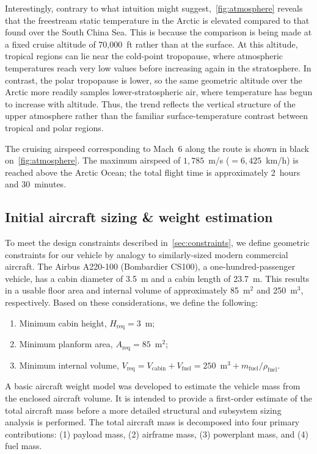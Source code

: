 \documentclass[10pt,a4paper]{article}
\begin{document}
Interestingly, contrary to what intuition might suggest,\ \cref{fig:atmosphere} reveals that the freestream static temperature in the Arctic is elevated compared to that found over the South China Sea. This is because the comparison is being made at a fixed cruise altitude of 70,000~ft rather than at the surface. At this altitude, tropical regions can lie near the cold-point tropopause, where atmospheric temperatures reach very low values before increasing again in the stratosphere. In contrast, the polar tropopause is lower, so the same geometric altitude over the Arctic more readily samples lower-stratospheric air, where temperature has begun to increase with altitude. Thus, the trend reflects the vertical structure of the upper atmosphere rather than the familiar surface-temperature contrast between tropical and polar regions.

The cruising airspeed corresponding to Mach~6 along the route is shown in black on~\cref{fig:atmosphere}. The maximum airspeed of $1{,}785$~m/s ($=6{,}425$~km/h) is reached above the Arctic Ocean; the total flight time is approximately 2~hours and 30~minutes.

\subsection{Initial aircraft sizing \& weight estimation}\label{sec:weight}
To meet the design constraints described in~\cref{sec:constraints}, we define geometric constraints for our vehicle by analogy to similarly-sized modern commercial aircraft. The Airbus A220-100 (Bombardier CS100), a one-hundred-passenger vehicle, has a cabin diameter of 3.5~m and a cabin length of 23.7~m. This results in a usable floor area and internal volume of approximately 85~m$^2$ and 250~m$^3$, respectively. Based on these considerations, we define the following:
\begin{enumerate}
    \item Minimum cabin height, $H_\text{req}=3$~m;
    \item Minimum planform area, $A_\text{req}=85$~m$^2$;
    \item Minimum internal volume, $V_\text{req} = V_\text{cabin} + V_\text{fuel}=250$~m$^3+m_\text{fuel}/\rho_\text{fuel}$.
\end{enumerate}

A basic aircraft weight model was developed to estimate the vehicle mass from the enclosed aircraft volume. It is intended to provide a first-order estimate of the total aircraft mass before a more detailed structural and subsystem sizing analysis is performed. The total aircraft mass is decomposed into four primary contributions: (1) payload mass, (2) airframe mass, (3) powerplant mass, and (4) fuel mass.
\end{document}
